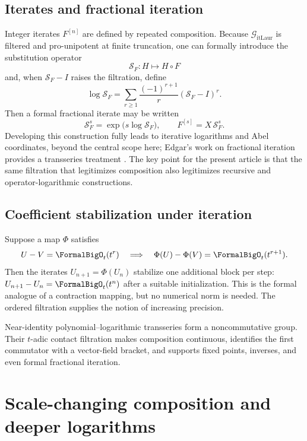 \documentclass[11pt,oneside]{book}
\theoremstyle{definition}
\theoremstyle{remark}
\newcommand{\compose}{\mathbin{\circ}}
\begin{document}
\section{Iterates and fractional iteration}
Integer iterates $F^{[n]}$ are defined by repeated composition.  Because
$\mathcal G_{\mathrm{itLaur}}$ is filtered and pro-unipotent at finite truncation, one can
formally introduce the substitution operator
\[
 \mathcal S_F:H\longmapsto H\compose F
\]
and, when $\mathcal S_F-I$ raises the filtration, define
\begin{equation}\label{eq:substitution-log}
 \log\mathcal S_F
 =\sum_{r\ge1}\frac{(-1)^{r+1}}r(\mathcal S_F-I)^r.
\end{equation}
Then a formal fractional iterate may be written
\[
 \mathcal S_F^s=\exp\bigl(s\log\mathcal S_F\bigr),
 \qquad
 F^{[s]}=X\,\mathcal S_F^s.
\]
Developing this construction fully leads to iterative logarithms and Abel
coordinates, beyond the central scope here; Edgar's work on fractional
iteration provides a transseries treatment \cite{EdgarFractional}.  The key
point for the present article is that the same filtration that legitimizes
composition also legitimizes recursive and operator-logarithmic constructions.

\section{Coefficient stabilization under iteration}
Suppose a map $\Phi$ satisfies
\begin{equation}\label{eq:contraction-general}
 U-V=\FormalBigO_t(t^r)
 \quad\Longrightarrow\quad
 \Phi(U)-\Phi(V)=\FormalBigO_t(t^{r+1}).
\end{equation}
Then the iterates $U_{n+1}=\Phi(U_n)$ stabilize one additional block per step:
$U_{n+1}-U_n=\FormalBigO_t(t^n)$ after a suitable initialization.  This is the
formal analogue of a contraction mapping, but no numerical norm is needed.
The ordered filtration supplies the notion of increasing precision.

\begin{summarybox}
Near-identity polynomial--logarithmic transseries form a noncommutative group.
Their $t$-adic contact filtration makes composition continuous, identifies the
first commutator with a vector-field bracket, and supports fixed points,
inverses, and even formal fractional iteration.
\end{summarybox}


\chapter{Scale-changing composition and deeper logarithms}
\label{ch:composition-scale}
\end{document}
